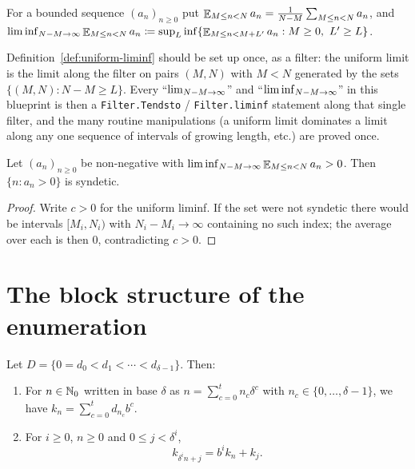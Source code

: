 \begin{definition}
  \label{def:uniform-liminf}
  \leanok
  For a bounded sequence $(a_n)_{n \geq 0}$ put $\mathop{\mathbb{E}}_{M \leq n < N} a_n = \frac{1}{N-M}\sum_{M \leq n < N} a_n$,
  and $\liminf_{N-M \to \infty} \mathop{\mathbb{E}}_{M \leq n < N} a_n \coloneqq \sup_{L} \inf \{ \mathop{\mathbb{E}}_{M \leq n < M+L'} a_n : M \geq 0,\ L' \geq L \}$.
\end{definition}

\begin{remark}
  Definition~\ref{def:uniform-liminf} should be set up once, as a filter: the uniform limit is
  the limit along the filter on pairs $(M,N)$ with $M < N$ generated by the sets
  $\{(M,N) : N - M \geq L\}$.  Every ``$\lim_{N-M \to \infty}$'' and ``$\liminf_{N-M \to \infty}$'' in this blueprint is
  then a \texttt{Filter.Tendsto} / \texttt{Filter.liminf} statement along that single filter,
  and the many routine manipulations (a uniform limit dominates a limit along any one sequence
  of intervals of growing length, etc.) are proved once.
\end{remark}

\begin{lemma}
  \label{lem:pos-liminf-syndetic}
  \leanok
  Let $(a_n)_{n \geq 0}$ be non-negative with $\liminf_{N-M \to \infty} \mathop{\mathbb{E}}_{M \leq n < N} a_n > 0$.  Then
  $\{ n : a_n > 0 \}$ is syndetic.
\end{lemma}

\begin{proof}
  \leanok
  Write $c > 0$ for the uniform liminf.  If the set were not syndetic there would be intervals
  $[M_i, N_i)$ with $N_i - M_i \to \infty$ containing no such index; the average over each is
  then $0$, contradicting $c > 0$.
\end{proof}

\section{The block structure of the enumeration}

\begin{lemma}
  \label{lem:diff}
  \leanok
  Let $D = \{0 = d_0 < d_1 < \cdots < d_{\delta-1}\}$.  Then:
  \begin{enumerate}
    \item[(i)] For $n \in \mathbb{N}_0$ written in base $\delta$ as $n = \sum_{c=0}^{t} n_c \delta^c$
      with $n_c \in \{0,\dots,\delta-1\}$, we have $k_n = \sum_{c=0}^{t} d_{n_c} b^c$.
    \item[(ii)] For $i \geq 0$, $n \geq 0$ and $0 \leq j < \delta^i$,
      \[ k_{\delta^i n + j} = b^i k_n + k_j . \]
  \end{enumerate}
\end{lemma}

